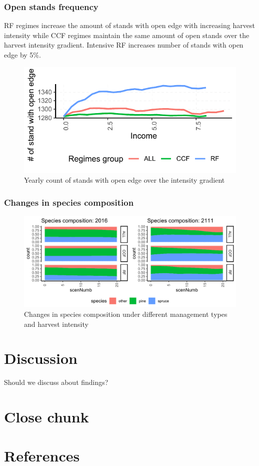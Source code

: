\documentclass[]{elsarticle} %
\makeatletter
\def\maxwidth{\ifdim\Gin@nat@width>\linewidth\linewidth
\else\Gin@nat@width\fi}
\let\Oldincludegraphics\includegraphics
\renewcommand{\includegraphics}[1]{\Oldincludegraphics[width=\maxwidth]{#1}}
\makeatother
\begin{document}
\subsubsection{Open stands frequency}\label{open-stands-frequency}

RF regimes increase the amount of stands with open edge with increasing
harvest intensity while CCF regimes maintain the same amount of open
stands over the harvest intensity gradient. Intensive RF increases
number of stands with open edge by 5\%.

\begin{figure}
\centering
\includegraphics{test_manus_files/figure-latex/fig_6_count_open_edge-1.pdf}
\caption{Yearly count of stands with open edge over the intensity
gradient}
\end{figure}

\subsubsection{Changes in species
composition}\label{changes-in-species-composition}

\begin{figure}
\centering
\includegraphics{test_manus_files/figure-latex/fig_7_species_change-1.pdf}
\caption{Changes in species composition under different management types
and harvest intensity}
\end{figure}

\section{Discussion}\label{discussion}

Should we discuss about findings?

\section{Close chunk}\label{close-chunk}

\section*{References}\label{references}
\end{document}
